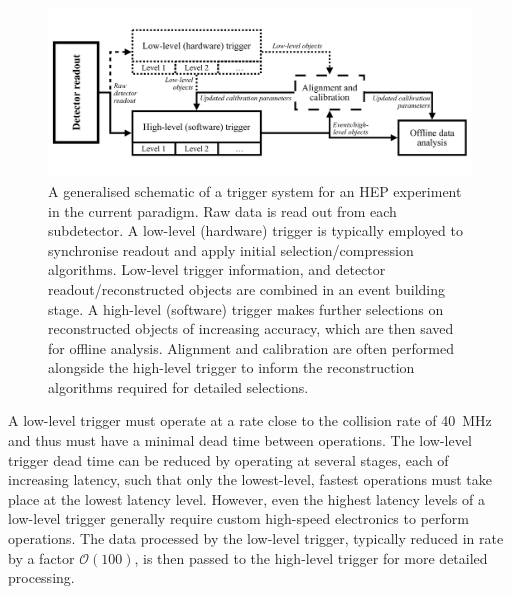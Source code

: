 \begin{figure}[h!]
    \centering
    \includegraphics[width=\linewidth]{images/trigger_schematic.pdf}
    \caption[A generalised schematic of a trigger system for a HEP experiment in the current paradigm. Raw data is read out from each subdetector. A low-level (hardware) trigger is typically employed to synchronise readout and apply initial selection/compression algorithms. A high-level (software) trigger makes further selections on reconstructed objects of increasing accuracy, which are then saved for offline analysis. Alignment and calibration are often performed alongside the high-level trigger to inform the reconstruction algorithms required for detailed selections.]{A generalised schematic of a trigger system for an HEP experiment in the current paradigm. Raw data is read out from each subdetector. A low-level (hardware) trigger is typically{\protect\footnotemark} employed to synchronise readout and apply initial selection/compression algorithms. Low-level trigger information, and detector readout/reconstructed objects are combined in an event building stage. A high-level (software) trigger makes further selections on reconstructed objects of increasing accuracy, which are then saved for offline analysis. Alignment and calibration are often performed alongside the high-level trigger to inform the reconstruction algorithms required for detailed selections.}
    \label{trigger-schema}
\end{figure}


A low-level trigger must operate at a rate close to the collision rate of \SI{40}{\mega\hertz} and thus must have a minimal dead time between operations. The low-level trigger dead time can be reduced by operating at several stages, each of increasing latency, such that only the lowest-level, fastest operations must take place at the lowest latency level. However, even the highest latency levels of a low-level trigger generally require custom high-speed electronics to perform operations. The data processed by the low-level trigger, typically reduced in rate by a factor $\mathcal{O}\left(100\right)$, is then passed to the high-level trigger for more detailed processing.

